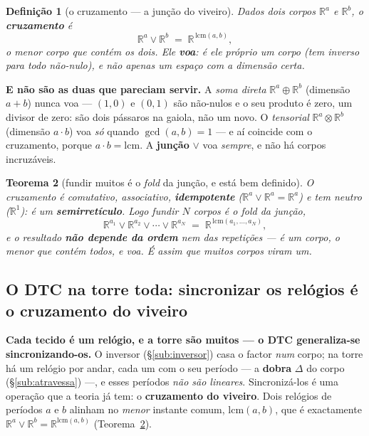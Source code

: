 \documentclass[11pt,a4paper]{article}
\newtheorem{teorema}{Teorema}
\newtheorem{definicao}[teorema]{Definição}
\begin{document}
\begin{definicao}[o cruzamento --- a junção do viveiro]\label{def:viveiro}
Dados dois corpos $\mathbb{R}^a$ e $\mathbb{R}^b$, o \textbf{cruzamento} é
\[
  \mathbb{R}^a \vee \mathbb{R}^b \;=\; \mathbb{R}^{\,\mathrm{lcm}(a,b)},
\]
o \emph{menor} corpo que contém os dois. Ele \textbf{voa}: é ele próprio um corpo (tem inverso para todo
não-nulo), e não apenas um espaço com a dimensão certa.
\end{definicao}

\noindent \textbf{E não são as duas que pareciam servir.} A \emph{soma direta} $\mathbb{R}^a\oplus\mathbb{R}^b$ (dimensão
$a{+}b$) nunca voa --- $(1,0)$ e $(0,1)$ são não-nulos e o seu produto é zero, um divisor de zero: são
dois pássaros na gaiola, não um novo. O \emph{tensorial} $\mathbb{R}^a\otimes\mathbb{R}^b$ (dimensão $a{\cdot}b$) voa
\emph{só} quando $\gcd(a,b)=1$ --- e aí coincide com o cruzamento, porque $a{\cdot}b=\mathrm{lcm}$. A
\textbf{junção} $\vee$ voa \emph{sempre}, e não há corpos incruzáveis.

\begin{teorema}[fundir muitos é o \emph{fold} da junção, e está bem definido]\label{thm:viveiro}
O cruzamento é comutativo, associativo, \textbf{idempotente} ($\mathbb{R}^a\vee\mathbb{R}^a=\mathbb{R}^a$) e tem neutro
($\mathbb{R}^1$): é um \textbf{semirretículo}. Logo fundir $N$ corpos é o \emph{fold} da junção,
\[
  \mathbb{R}^{a_1}\vee\mathbb{R}^{a_2}\vee\cdots\vee\mathbb{R}^{a_N} \;=\; \mathbb{R}^{\,\mathrm{lcm}(a_1,\dots,a_N)},
\]
e o resultado \textbf{não depende da ordem} nem das repetições --- é \emph{um} corpo, o menor que contém
todos, e voa. \emph{É assim que muitos corpos viram um.}
\end{teorema}

\subsection*{O DTC na torre toda: sincronizar os relógios é o cruzamento do viveiro}\label{sub:dtctorre}

\textbf{Cada tecido é um relógio, e a torre são muitos --- o DTC generaliza-se sincronizando-os.} O
inversor (\S\ref{sub:inversor}) casa o factor \emph{num} corpo; na torre há um relógio por andar, cada
um com o seu período --- a \textbf{dobra} $\Delta$ do corpo (\S\ref{sub:atravessa}) ---, e esses
períodos \emph{não são lineares}. Sincronizá-los é uma operação que a teoria já tem: o \textbf{cruzamento
do viveiro}. Dois relógios de períodos $a$ e $b$ alinham no \emph{menor} instante comum,
$\mathrm{lcm}(a,b)$, que é exactamente $\mathbb{R}^a\vee\mathbb{R}^b=\mathbb{R}^{\mathrm{lcm}(a,b)}$ (Teorema~\ref{thm:viveiro}).
\end{document}
